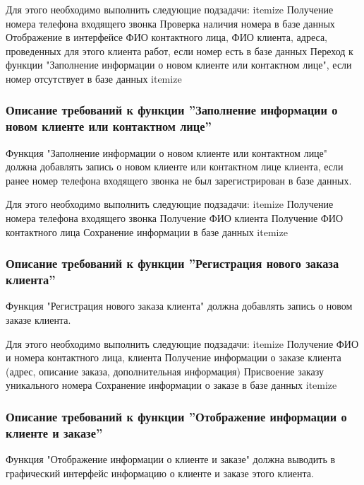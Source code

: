 \documentclass[russian, utf8, 12pt,pointsubsection,floatsubsection]{eskdtext}
\begin{document}
Для этого необходимо выполнить следующие подзадачи:
itemize
Получение номера телефона входящего звонка
Проверка наличия номера в базе данных
Отображение в интерфейсе ФИО контактного лица, ФИО клиента, адреса, проведенных для этого клиента работ, если номер есть в базе данных
Переход к функции "Заполнение информации о новом клиенте или контактном лице", если номер отсутствует в базе данных
itemize

\subsubsection{Описание требований к функции ''Заполнение информации о новом клиенте или контактном лице''}
Функция "Заполнение информации о новом клиенте или контактном лице" должна добавлять запись о новом клиенте или контактном лице клиента, если ранее номер телефона входящего звонка не был зарегистрирован в базе данных.

Для этого необходимо выполнить следующие подзадачи:
itemize
Получение номера телефона входящего звонка
Получение ФИО клиента
Получение ФИО контактного лица
Сохранение информации в базе данных
itemize

\subsubsection{Описание требований к функции ''Регистрация нового заказа клиента''}
Функция "Регистрация нового заказа клиента" должна добавлять запись о новом заказе клиента.

Для этого необходимо выполнить следующие подзадачи:
itemize
Получение ФИО и номера контактного лица, клиента
Получение информации о заказе клиента (адрес, описание заказа, дополнительная информация)
Присвоение заказу уникального номера
Сохранение информации о заказе в базе данных
itemize


\subsubsection{Описание требований к функции ''Отображение информации о клиенте и заказе''}
Функция "Отображение информации о клиенте и заказе" должна выводить в графический интерфейс информацию о клиенте и заказе этого клиента.
\end{document}
